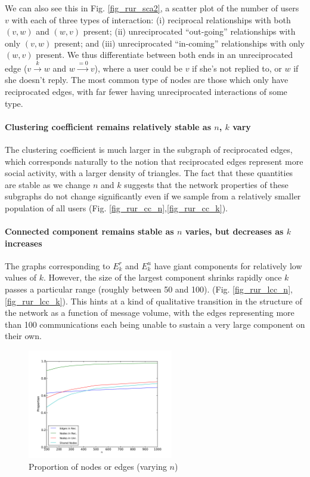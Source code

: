 \documentclass[conference]{IEEEtran}
\begin{document}
We can also see this in Fig. \ref{fig_rur_sca2}, a scatter plot of the
number of users $v$ with each of three types of interaction:
(i) reciprocal relationships with both $(v,w)$ and $(w,v)$ present;
(ii) unreciprocated ``out-going'' relationships with only $(v,w)$ present;
and 
(iii) unreciprocated ``in-coming'' relationships with only $(w,v)$ present.
We thus differentiate between both ends in an
unreciprocated edge ($v \xrightarrow{k} w$ and $w \xrightarrow{=0} v$),
where a user could be $v$ if she's not replied to, or $w$ if she
doesn't reply.  The most common type of nodes are those which only
have reciprocated edges, with far fewer having unreciprocated
interactions of some type.

\paragraph*{Clustering coefficient remains relatively stable as $n$, $k$ vary}
The clustering coefficient is much larger in the subgraph of reciprocated
edges, which corresponds naturally to the notion that reciprocated 
edges represent more social activity, with a larger density of triangles.
The fact that these quantities are stable as we change $n$ and $k$ suggests
that the network properties of these subgraphs do not change significantly even if we sample from a relatively smaller population of all users (Fig. \ref{fig_rur_cc_n},\ref{fig_rur_cc_k}).

\paragraph*{Connected component remains stable as $n$ varies, but decreases as $k$ increases} 
The graphs corresponding to $E_k^r$ and $E_k^u$ have giant components
for relatively low values of $k$.
However, the size of the largest component shrinks rapidly once 
$k$ passes a particular range (roughly between 50 and 100).
(Fig. \ref{fig_rur_lcc_n},\ref{fig_rur_lcc_k}).
This hints at a kind of qualitative transition in the structure of the
network as a function of message volume, with the edges representing 
more than 100 communications each being unable to sustain a very large
component on their own.

\begin{figure}[!t]
\centering
\includegraphics[width=2.5in]{proportion_edgesnodes_n}                
\caption{Proportion of nodes or edges (varying $n$)}
\label{fig_rur_propn}
\end{figure}
\end{document}
